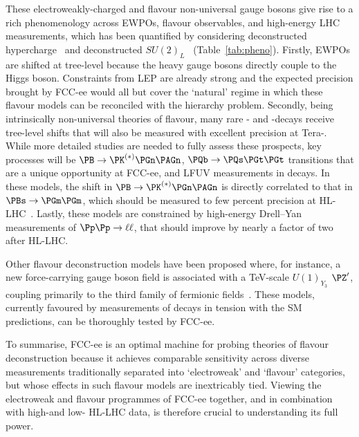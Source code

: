 These electroweakly-charged and flavour non-universal gauge bosons give rise to a rich phenomenology 
across EWPOs, flavour observables, and high-energy LHC measurements,
which has been quantified by considering deconstructed hypercharge~\cite{Davighi:2023evx} 
and deconstructed $SU(2)_L$~\cite{Davighi:2023xqn} (Table~\ref{tab:pheno}). 
Firstly, EWPOs are shifted at tree-level because the heavy gauge bosons directly couple to the Higgs boson.
Constraints from LEP are already strong and the expected precision brought by FCC-ee would all but cover the `natural' regime 
in which these flavour models can be reconciled with the hierarchy problem. 
Secondly, being intrinsically non-universal theories of flavour, 
many rare \PB- and \PGt-decays receive tree-level shifts that will also be measured with excellent precision at \mbox{Tera-\PZ}.
While more detailed studies are needed to fully assess these prospects, 
key processes will be $\PB \to \PK^{(\ast)}\PGn\PAGn$, $\PQb \to \PQs\PGt\PGt$ transitions 
that are a unique opportunity at FCC-ee, and LFUV measurements in \PGt decays. 
In these models, the shift in $\PB \to \PK^{(\ast)}\PGn\PAGn$ 
is directly correlated to that in $\PBs \to \PGm\PGm$, 
which should be measured to few percent precision at HL-LHC~\cite{LHCb:2018roe}.
Lastly, these models are constrained by high-energy Drell--Yan measurements of $\Pp\Pp \to \ell\ell$, 
that should improve by nearly a factor of two after HL-LHC. 

Other flavour deconstruction models have been proposed where, for instance, 
a new force-carrying gauge boson field is associated with a TeV-scale $U(1)_{Y_3}$ $\PZ^\prime$, 
coupling primarily to the third family of fermionic fields~\cite{Allanach:2025wfi}.  
These models, currently favoured by measurements of \PB decays in tension with the SM predictions, 
can be thoroughly tested by FCC-ee.

To summarise, FCC-ee is an optimal machine for probing theories of flavour deconstruction 
because it achieves comparable sensitivity across diverse measurements 
traditionally separated into `electroweak' and `flavour' categories, 
but whose effects in such flavour models are inextricably tied. 
Viewing the electroweak and flavour programmes of FCC-ee together, 
and in combination with high-\pt and \mbox{low-\pt}  HL-LHC data, 
is therefore crucial to understanding its full power. 


